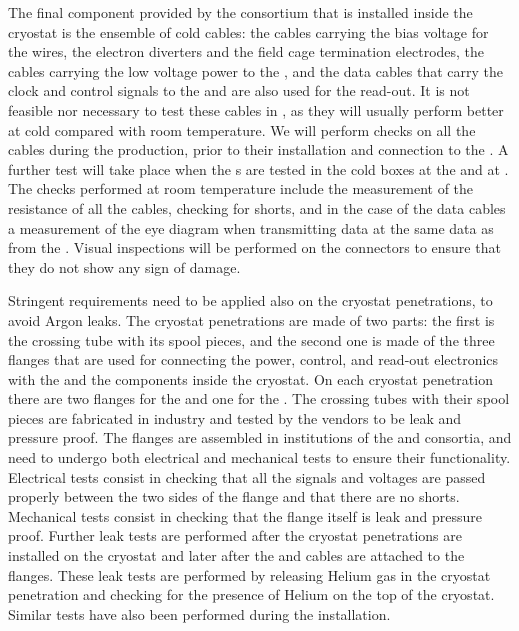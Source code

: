 The final component provided by the  consortium
that is installed inside the cryostat is the ensemble of cold
cables: the cables carrying the bias voltage for the 
wires, the electron diverters and the field cage termination electrodes,
the cables carrying the low voltage power to the ,
and the data cables that carry the clock and control signals
to the  and are also used for the read-out. It is not
feasible nor necessary to test these cables in \lntwo,
as they will usually perform better at cold compared with
room temperature. We will perform checks on all the cables 
during the production, prior to their installation and 
connection to the . A further test will take place
when the s are tested in the cold boxes at the 
and at \surf. The checks performed at room temperature include
the measurement of the resistance of all the cables, checking for
shorts, and in the case of the data cables a measurement of the
eye diagram when transmitting data at the same data as from the
. Visual inspections will be performed on the connectors
to ensure that they do not show any sign of damage.

Stringent requirements need to be applied also on the cryostat
penetrations, to avoid Argon leaks. The cryostat penetrations are
made of two parts: the first is the crossing tube with its spool pieces,
and the second one is made of the three flanges that are used for
connecting the power, control, and read-out electronics with the
 and the  components inside the
cryostat. On each cryostat penetration there are two flanges for
the  and one for the . The crossing
tubes with their spool pieces are fabricated in industry and tested
by the vendors to be leak and pressure proof. The flanges are assembled
in institutions of the  and  consortia,
and need to undergo both electrical and mechanical tests to ensure their
functionality. Electrical tests consist in checking that all the
signals and voltages are passed properly between the two sides of the
flange and that there are no shorts. Mechanical tests consist in 
checking that the flange itself is leak and pressure proof. Further
leak tests are performed after the cryostat penetrations are installed
on the cryostat and later after the  and 
cables are attached to the flanges. These leak tests are
performed by releasing Helium gas in the cryostat penetration and
checking for the presence of Helium on the top of the cryostat. Similar
tests have also been performed during the  installation.

